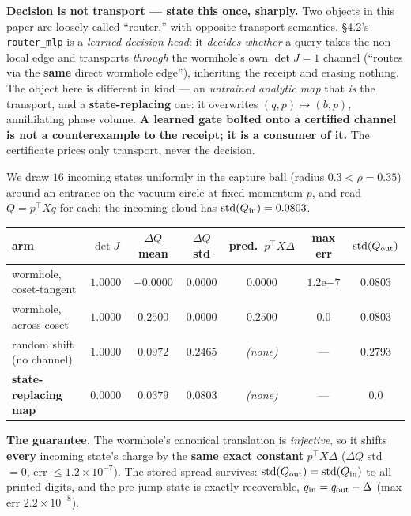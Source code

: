 \documentclass[11pt]{article}
\newcommand{\detJ}{\det J}
\begin{document}
\textbf{Decision is not transport --- state this once, sharply.} Two objects in this paper are loosely called ``router,'' with opposite transport semantics. \S4.2's \texttt{router\_mlp} is a \emph{learned decision head}: it \emph{decides whether} a query takes the non-local edge and transports \emph{through} the wormhole's own $\detJ=1$ channel (``routes via the \textbf{same} direct wormhole edge''), inheriting the receipt and erasing nothing. The object here is different in kind --- an \emph{untrained analytic map} that \emph{is} the transport, and a \textbf{state-replacing} one: it overwrites $(q,p)\mapsto(b,p)$, annihilating phase volume. \textbf{A learned gate bolted onto a certified channel is not a counterexample to the receipt; it is a consumer of it.} The certificate prices only transport, never the decision.

We draw $16$ incoming states uniformly in the capture ball (radius $0.3<\rho=0.35$) around an entrance on the vacuum circle at fixed momentum $p$, and read $Q=p^\top X q$ for each; the incoming cloud has $\mathrm{std}(Q_{\rm in})=0.0803$.

\begin{center}\footnotesize
\begin{tabular}{lcccccc}
\toprule
arm & $\detJ$ & $\Delta Q$ mean & $\Delta Q$ std & pred.\ $p^\top X\Delta$ & max err & $\mathrm{std}(Q_{\rm out})$ \\
\midrule
wormhole, coset-tangent & $\mathbf{1.0000}$ & $-0.0000$ & $0.0000$ & $0.0000$ & $1.2\mathrm{e}{-7}$ & $\mathbf{0.0803}$ \\
wormhole, across-coset & $\mathbf{1.0000}$ & $0.2500$ & $0.0000$ & $0.2500$ & $\mathbf{0.0}$ & $\mathbf{0.0803}$ \\
random shift (no channel) & $1.0000$ & $0.0972$ & $0.2465$ & \emph{(none)} & --- & $0.2793$ \\
\textbf{state-replacing map} & $\mathbf{0.0000}$ & $0.0379$ & $0.0803$ & \emph{(none)} & --- & $\mathbf{0.0}$ \\
\bottomrule
\end{tabular}
\end{center}

\textbf{The guarantee.} The wormhole's canonical translation is \emph{injective}, so it shifts \textbf{every} incoming state's charge by the \textbf{same exact constant} $p^\top X\Delta$ ($\Delta Q$ std $=0$, err $\le1.2{\times}10^{-7}$). The stored spread survives: $\mathrm{std}(Q_{\rm out})=\mathrm{std}(Q_{\rm in})$ to all printed digits, and the pre-jump state is exactly recoverable, $q_{\rm in}=q_{\rm out}-\Delta$ (max err $2.2{\times}10^{-8}$).
\end{document}
